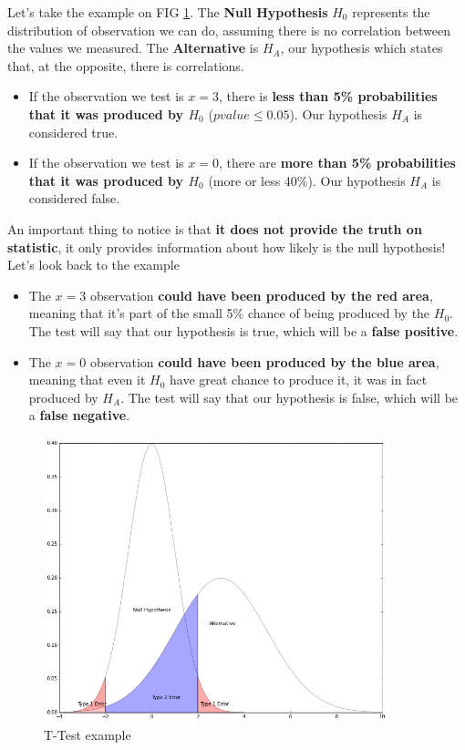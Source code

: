 Let's take the example on FIG \ref{pic:ttest}. The \textbf{Null Hypothesis} $H_0$ represents the distribution of observation we can do, assuming there is no correlation between the values we measured. The \textbf{Alternative} is $H_A$, our hypothesis which states that, at the opposite, there is correlations.
\begin{itemize}
	\item If the observation we test is $x=3$, there is \textbf{less than 5\% probabilities that it was produced by $H_0$} ($pvalue \leq 0.05$). Our hypothesis $H_A$ is considered true.

	\item If the observation we test is $x=0$, there are \textbf{more than 5\% probabilities that it was produced by $H_0$} (more or less 40\%). Our hypothesis $H_A$ is considered false.
\end{itemize}

{\color{red} An important thing to notice is that \textbf{it does not provide the truth on statistic}, it only provides information about how likely is the null hypothesis! Let's look back to the example}

\begin{itemize}
	\item The $x=3$ observation \textbf{could have been produced by the red area}, meaning that it's part of the small 5\% chance of being produced by the $H_0$. The test will say that our hypothesis is true, which will be a \textbf{false positive}.

	\item The $x=0$ observation \textbf{could have been produced by the blue area}, meaning that even it $H_0$ have great chance to produce it, it was in fact produced by $H_A$.  The test will say that our hypothesis is false, which will be a \textbf{false negative}.
\end{itemize}

\begin{figure}[h]%
 \centering
 \includegraphics[width=10cm]{./img/05/t-test}
 \caption{\label{pic:ttest} T-Test example}
\end{figure}

